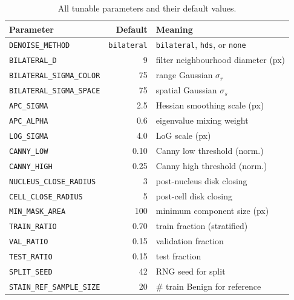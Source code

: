 \documentclass[conference,10pt]{IEEEtran}
\begin{document}
\begin{table}[h!]
  \centering
  \caption{All tunable parameters and their default values.}
  \small
  \begin{tabular}{@{}lrl@{}}
    \toprule
    Parameter & Default & Meaning \\
    \midrule
    \texttt{DENOISE\_METHOD}       & \texttt{bilateral} & \texttt{bilateral}, \texttt{hds}, or \texttt{none} \\
    \texttt{BILATERAL\_D}          & 9                 & filter neighbourhood diameter (px) \\
    \texttt{BILATERAL\_SIGMA\_COLOR}    & 75    & range Gaussian $\sigma_r$ \\
    \texttt{BILATERAL\_SIGMA\_SPACE}    & 75    & spatial Gaussian $\sigma_s$ \\
    \texttt{APC\_SIGMA}            & 2.5               & Hessian smoothing scale (px) \\
    \texttt{APC\_ALPHA}            & 0.6               & eigenvalue mixing weight \\
    \texttt{LOG\_SIGMA}            & 4.0               & LoG scale (px) \\
    \texttt{CANNY\_LOW}            & 0.10              & Canny low threshold (norm.) \\
    \texttt{CANNY\_HIGH}           & 0.25              & Canny high threshold (norm.) \\
    \texttt{NUCLEUS\_CLOSE\_RADIUS} & 3                & post-nucleus disk closing \\
    \texttt{CELL\_CLOSE\_RADIUS}   & 5                 & post-cell disk closing \\
    \texttt{MIN\_MASK\_AREA}       & 100               & minimum component size (px) \\
    \texttt{TRAIN\_RATIO}          & 0.70              & train fraction (stratified) \\
    \texttt{VAL\_RATIO}            & 0.15              & validation fraction \\
    \texttt{TEST\_RATIO}           & 0.15              & test fraction \\
    \texttt{SPLIT\_SEED}           & 42                & RNG seed for split \\
    \texttt{STAIN\_REF\_SAMPLE\_SIZE} & 20             & \# train Benign for reference \\
    \bottomrule
  \end{tabular}
\end{table}
\end{document}
